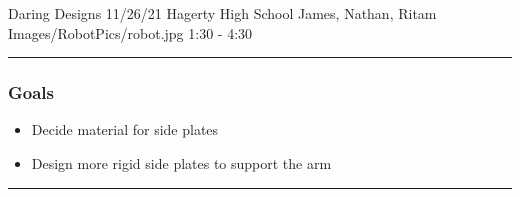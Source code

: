 \insertmeeting 
	{Daring Designs} 
	{11/26/21}
	{Hagerty High School}
	{James, Nathan, Ritam}
	{Images/RobotPics/robot.jpg}
	{1:30 - 4:30}
	
\noindent\hfil\rule{\textwidth}{.4pt}\hfil
\subsubsection*{Goals}
\begin{itemize}
    \item Decide material for side plates
    \item Design more rigid side plates to support the arm
  

\end{itemize} 

\noindent\hfil\rule{\textwidth}{.4pt}\hfil

